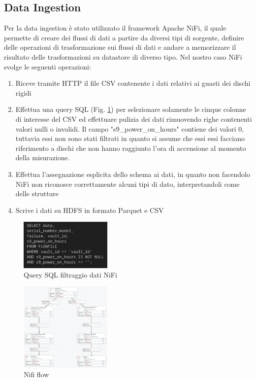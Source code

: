 \documentclass[conference]{IEEEtran}
\begin{document}
\subsection{Data Ingestion}
Per la data ingestion è stato utilizzato il framework Apache NiFi, il quale permette di creare dei flussi di dati a partire da diversi tipi di sorgente, definire delle operazioni di trasformazione sui flussi di dati e andare a memorizzare il risultato delle trasformazioni su datastore di diverso tipo. Nel nostro caso NiFi svolge le seguenti operazioni:
\begin{enumerate}
    \item Riceve tramite HTTP il file CSV contenente i dati relativi ai guasti dei dischi rigidi
    \item Effettua una query SQL (Fig. \ref{fig:nifi_query}) per selezionare solamente le cinque colonne di interesse del CSV ed effettuare pulizia dei dati rimuovendo righe contenenti valori nulli o invalidi. Il campo "s9\_power\_on\_hours" contiene dei valori 0, tuttavia essi non sono stati filtrati in quanto si assume che essi essi facciano riferimento a dischi che non hanno raggiunto l'ora di accensione al momento della misurazione.
    \item Effettua l'assegnazione esplicita dello schema ai dati, in quanto non facendolo NiFi non riconosce correttamente alcuni tipi di dato, interpretandoli come delle strutture
    \item Scrive i dati su HDFS in formato Parquet e CSV
\end{enumerate}
\begin{figure}[H]
    \centering
    \includegraphics[width=0.4\textwidth]{./res/query_nifi.png}
    \caption{Query SQL filtraggio dati NiFi}
    \label{fig:nifi_query}
\end{figure} 
\begin{figure}[H]
    \centering
    \includegraphics[width=0.4\textwidth]{./res/nifi_flow.png}
    \caption{Nifi flow}
    \label{fig:nifi_flow}
\end{figure} 
\end{document}
